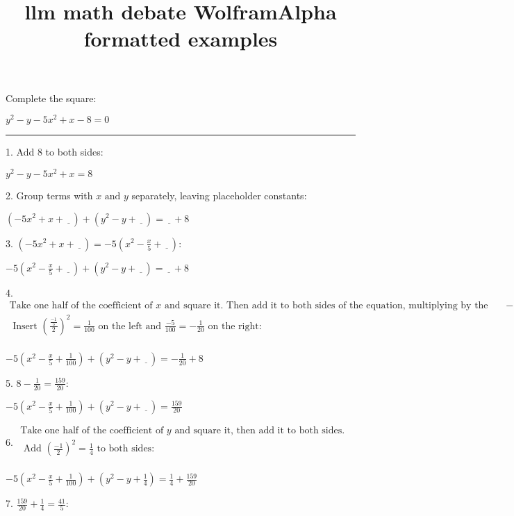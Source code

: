 \documentclass{article}
\title{llm math debate WolframAlpha formatted examples}
\begin{document}
\maketitle

Complete the square:

$y^2-y-5 x^2+x-8=0$

\hrule

1. Add $8$ to both sides:

$y^2-y-5 x^2+x=8$

2. Group terms with $x\text{ and }y$ separately, leaving placeholder constants:

$\left(-5 x^2+x+\underline{\text{   }}\right)+\left(y^2-y+\underline{\text{   }}\right)=\underline{\text{   }}+8$

3. $\left(-5 x^2+x+\underline{\text{   }}\right)=-5 \left(x^2-\frac{x}{5}+\underline{\text{   }}\right):$

$-5 \left(x^2-\frac{x}{5}+\underline{\text{   }}\right)+\left(y^2-y+\underline{\text{   }}\right)=\underline{\text{   }}+8$

4. $\begin{array}{l}
\text{Take one half of the coefficient of }x\text{ and square it. Then add it to both sides of the equation, multiplying by the factored constant }-5\text{ on the right. }\\
\text{ Insert }\left(\frac{\frac{-1}{5}}{2}\right)^2=\frac{1}{100}\text{ on the left and }\frac{-5}{100}=-\frac{1}{20}\text{ on the right}: \\
\end{array}$

$-5 \left(x^2-\frac{x}{5}+\frac{1}{100}\right)+\left(y^2-y+\underline{\text{   }}\right)=-\frac{1}{20}+8$

5. $8-\frac{1}{20}=\frac{159}{20}$:

$-5 \left(x^2-\frac{x}{5}+\frac{1}{100}\right)+\left(y^2-y+\underline{\text{   }}\right)=\frac{159}{20}$

6. $\begin{array}{l}
\text{Take one half of the coefficient of }y\text{ and square it, then add it to both sides. }\\
\text{ Add }\left(\frac{-1}{2}\right)^2=\frac{1}{4}\text{ to both sides}: \\
\end{array}$

$-5 \left(x^2-\frac{x}{5}+\frac{1}{100}\right)+\left(y^2-y+\frac{1}{4}\right)=\frac{1}{4}+\frac{159}{20}$

7. $\frac{159}{20}+\frac{1}{4}=\frac{41}{5}$:
\end{document}
